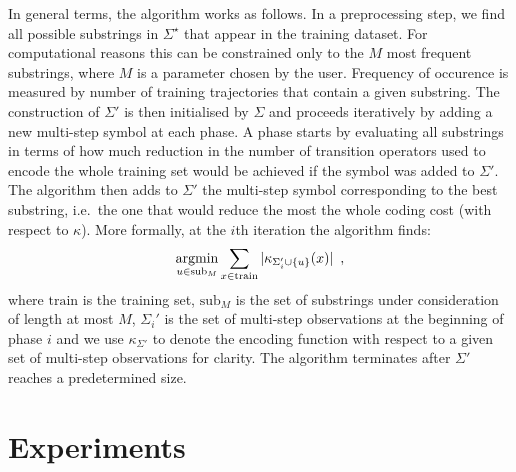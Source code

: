 \documentclass[letterpaper]{article}
\newcommand{\sstar}{\Sigma^\star}
\DeclareMathOperator*{\argmin}{\rm argmin}
\begin{document}
In general terms, the algorithm works as follows. In a preprocessing step, we find all possible substrings in $\sstar$ that appear in the training dataset. For computational reasons this can be constrained only to the $M$ most frequent substrings, where $M$ is a parameter chosen by the user. Frequency of occurence is measured by number of training trajectories that contain a given substring. The construction of $\Sigma'$ is then initialised by $\Sigma$ and proceeds iteratively by adding a new multi-step symbol at each phase. A phase starts by evaluating all substrings in terms of how much reduction in the number of transition operators used to encode the whole training set would be achieved if the symbol was added to $\Sigma'$. The algorithm then adds to $\Sigma'$ the multi-step symbol corresponding to the best substring, i.e.\ the one that would reduce the most the whole coding cost (with respect to $\kappa$). More formally, at the $i$th iteration the algorithm finds:
\begin{equation*}
\argmin_{u \in \mathrm{sub}_M} \sum_{x \in \mathrm{train}} |\kappa_{\Sigma_i' \cup \{u\}}(x)| \enspace,
\end{equation*}
where $\mathrm{train}$ is the training set, $\mathrm{sub}_M$ is the set of substrings under consideration of length at most $M$, $\Sigma_i'$ is the set of multi-step observations at the beginning of phase $i$ and we use $\kappa_{\Sigma'}$ to denote the encoding function with respect to a given set of multi-step observations for clarity. The algorithm terminates after $\Sigma'$ reaches a predetermined size.




\section{Experiments}\label{sec:exp}
\end{document}
